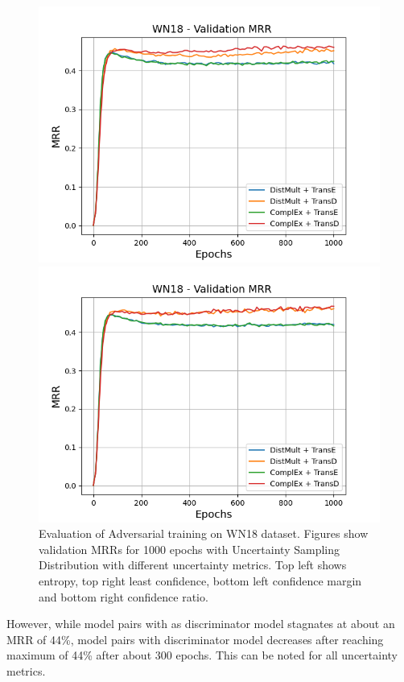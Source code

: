 \begin{figure}[H]
\begin{minipage}{.5\textwidth}
    \end{minipage}
    \begin{minipage}{.5\textwidth}
      \centering
      \includegraphics[width=0.9\linewidth]{figures/results/gan_train/not_pretrained/uncertainty/max_distribution/confidence_margin/wn18/uncertainty_wn18_mrrs.png}
    \end{minipage}%
    \begin{minipage}{.5\textwidth}
      \centering
      \includegraphics[width=0.9\linewidth]{figures/results/gan_train/not_pretrained/uncertainty/max_distribution/confidence_ratio/wn18/uncertainty_wn18_mrrs.png}
    \end{minipage}%
    \caption{Evaluation of Adversarial training on \textsc{WN18} dataset. 
    Figures show validation MRRs for 1000 epochs with Uncertainty Sampling Distribution with different uncertainty metrics.
    Top left shows entropy, top right least confidence, 
    bottom left confidence margin and bottom right confidence ratio.}
    \label{fig:advtrain_measures_wn18}
\end{figure}
However, while model pairs with \transd as discriminator model stagnates at about an MRR of 44\%, model pairs with \transe  discriminator model decreases after reaching maximum of 44\% after about 300 epochs.
This can be noted for all uncertainty metrics.


